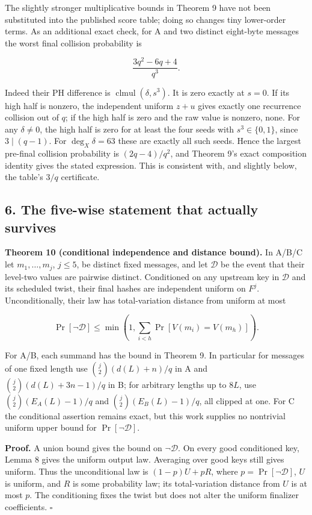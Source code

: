 \documentclass[
  11pt,
]{article}
\newcounter{none} %
\begin{document}
The slightly stronger multiplicative bounds in Theorem 9 have not been
substituted into the published score table; doing so changes tiny
lower-order terms. As an additional exact check, for A and two distinct
eight-byte messages the worst final collision probability is

\[ \frac{3q^2-6q+4}{q^3}. \]

Indeed their PH difference is \(\operatorname{clmul}(\delta,s^3)\). It
is zero exactly at \(s=0\). If its high half is nonzero, the independent
uniform \(z+u\) gives exactly one recurrence collision out of \(q\); if
the high half is zero and the raw value is nonzero, none. For any
\(\delta\ne0\), the high half is zero for at least the four seeds with
\(s^3\in\{0,1\}\), since \(3\mid(q-1)\). For \(\deg_X\delta=63\) these
are exactly all such seeds. Hence the largest pre-final collision
probability is \((2q-4)/q^2\), and Theorem 9's exact composition
identity gives the stated expression. This is consistent with, and
slightly below, the table's \(3/q\) certificate.

\subsection{6. The five-wise statement that actually
survives}\label{the-five-wise-statement-that-actually-survives}

\textbf{Theorem 10 (conditional independence and distance bound).} In
A/B/C let \(m_1,\ldots,m_j\), \(j\le5\), be distinct fixed messages, and
let \(\mathcal D\) be the event that their level-two values are pairwise
distinct. Conditioned on any upstream key in \(\mathcal D\) and its
scheduled twist, their final hashes are independent uniform on \(F^j\).
Unconditionally, their law has total-variation distance from uniform at
most

\[ \Pr[\neg\mathcal D]\le\min\left(1,\sum_{i<h}\Pr[V(m_i)=V(m_h)]\right). \]

For A/B, each summand has the bound in Theorem 9. In particular for
messages of one fixed length use \(\binom j2(d(L)+n)/q\) in A and
\(\binom j2(d(L)+3n-1)/q\) in B; for arbitrary lengths up to \(8L\), use
\(\binom j2(E_A(L)-1)/q\) and \(\binom j2(E_B(L)-1)/q\), all clipped at
one. For C the conditional assertion remains exact, but this work
supplies no nontrivial uniform upper bound for \(\Pr[\neg\mathcal D]\).

\textbf{Proof.} A union bound gives the bound on \(\neg\mathcal D\). On
every good conditioned key, Lemma 8 gives the uniform output law.
Averaging over good keys still gives uniform. Thus the unconditional law
is \((1-p)U+pR\), where \(p=\Pr[\neg\mathcal D]\), \(U\) is uniform, and
\(R\) is some probability law; its total-variation distance from \(U\)
is at most \(p\). The conditioning fixes the twist but does not alter
the uniform finalizer coefficients. \(\square\)
\end{document}
